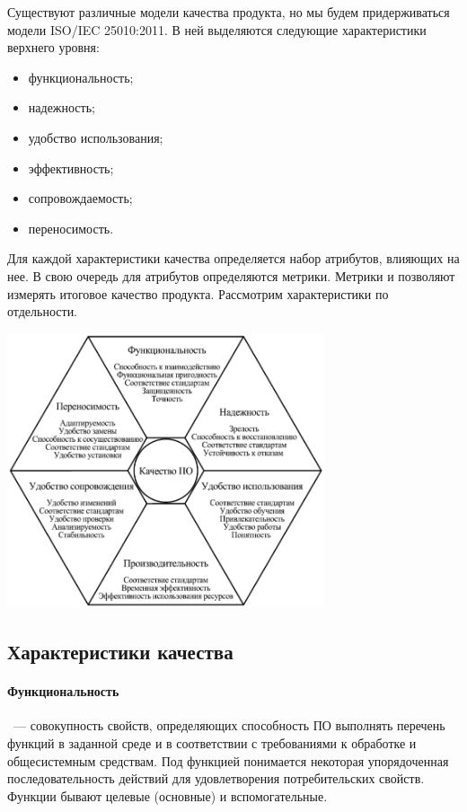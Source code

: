 \documentclass{../../text-style}
\begin{document}
Существуют различные модели качества продукта, но мы будем придерживаться модели ISO/IEC 25010:2011. В ней выделяются следующие характеристики верхнего уровня:

\begin{itemize}
    \item функциональность;
    \item надежность;
    \item удобство использования;
    \item эффективность;
    \item сопровождаемость;
    \item переносимость.
\end{itemize}

Для каждой характеристики качества определяется набор атрибутов, влияющих на нее. В свою очередь для атрибутов определяются метрики. Метрики и позволяют измерять итоговое качество продукта. Рассмотрим характеристики по отдельности.

\begin{center}
    \includegraphics[width=0.7\textwidth]{qualityCharacteristics.png}
\end{center}

\subsection{Характеристики качества}

\paragraph{Функциональность}~--- совокупность свойств, определяющих способность ПО выполнять перечень функций в заданной среде и в соответствии с требованиями к обработке и общесистемным средствам. Под функцией понимается некоторая упорядоченная последовательность действий для удовлетворения потребительских свойств. Функции бывают целевые (основные) и вспомогательные.
\end{document}
